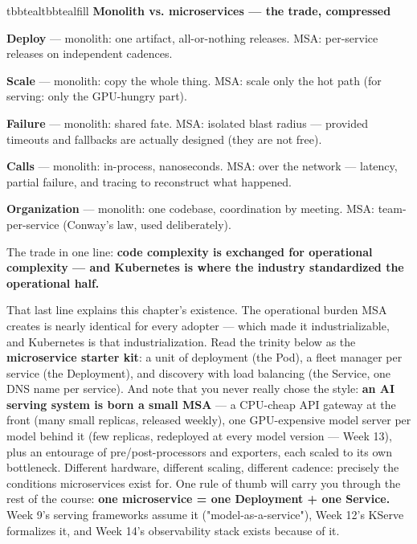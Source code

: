 \begin{calloutbox}{tbbteal}{tbbtealfill}
{\normalsize\bfseries\color{tbbteal}Monolith vs. microservices — the trade, compressed}\par\vspace{3pt}
\begin{tbbitemize}
  \item \textbf{Deploy} — monolith: one artifact, all-or-nothing releases. MSA: per-service releases on independent cadences.
  \item \textbf{Scale} — monolith: copy the whole thing. MSA: scale only the hot path (for serving: only the GPU-hungry part).
  \item \textbf{Failure} — monolith: shared fate. MSA: isolated blast radius — provided timeouts and fallbacks are actually designed (they are not free).
  \item \textbf{Calls} — monolith: in-process, nanoseconds. MSA: over the network — latency, partial failure, and tracing to reconstruct what happened.
  \item \textbf{Organization} — monolith: one codebase, coordination by meeting. MSA: team-per-service (Conway's law, used deliberately).
\end{tbbitemize}

The trade in one line: \textbf{code complexity is exchanged for operational complexity — and Kubernetes is where the industry standardized the operational half.}
\end{calloutbox}

\vspace{3.0pt}

That last line explains this chapter's existence. The operational burden MSA creates is nearly identical for every adopter — which made it industrializable, and Kubernetes is that industrialization. Read the trinity below as the \textbf{microservice starter kit}: a unit of deployment (the Pod), a fleet manager per service (the Deployment), and discovery with load balancing (the Service, one DNS name per service). And note that you never really chose the style: \textbf{an AI serving system is born a small MSA} — a CPU-cheap API gateway at the front (many small replicas, released weekly), one GPU-expensive model server per model behind it (few replicas, redeployed at every model version — Week 13), plus an entourage of pre/post-processors and exporters, each scaled to its own bottleneck. Different hardware, different scaling, different cadence: precisely the conditions microservices exist for. One rule of thumb will carry you through the rest of the course: \textbf{one microservice = one Deployment + one Service.} Week 9's serving frameworks assume it ("model-as-a-service"), Week 12's KServe formalizes it, and Week 14's observability stack exists because of it.

